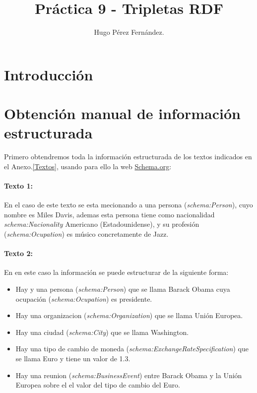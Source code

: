 \documentclass[spanish]{llncs}   %
\begin{document}
\title{Práctica 9 - Tripletas RDF}

\author{Hugo Pérez Fernández.  
}
\maketitle              

\section{Introducción}


\section{Obtención manual de información estructurada}

Primero obtendremos toda la información estructurada de los textos indicados en el Anexo.\ref{Textos}, usando para ello la web \href{https://schema.org}{Schema.org}:

\paragraph{Texto 1:}

En el caso de este texto se esta mecionando a una persona (\textit{schema:Person}), cuyo nombre es Miles Davis, ademas esta persona tiene como nacionalidad \textit{schema:Nacionality}
Americano (Estadounidense), y su profesión (\textit{schema:Ocupation}) es músico concretamente de Jazz.

\paragraph{Texto 2:}

En en este caso la información se puede estructurar de la siguiente forma:

\begin{itemize}
    \item Hay y una persona (\textit{schema:Person}) que se llama Barack Obama cuya ocupación (\textit{schema:Ocupation}) es presidente.
    \item Hay una organizacion (\textit{schema:Organization}) que se llama Unión Europea.
    \item Hay una ciudad (\textit{schema:City}) que se llama Washington.
    \item Hay una tipo de cambio de moneda (\textit{schema:ExchangeRateSpecification}) que se llama Euro y tiene un valor de 1.3.
    \item Hay una reunion (\textit{schema:BusinessEvent}) entre Barack Obama y la Unión Europea
    sobre el el valor del tipo de cambio del Euro.
\end{itemize}
\end{document}
